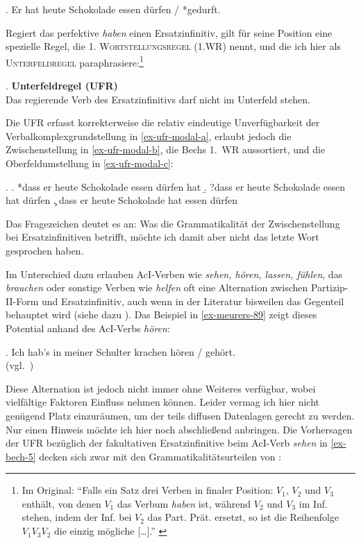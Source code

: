 \ex. Er hat heute Schokolade essen dürfen / *gedurft. \hfill \citep[(82)]{Meurers:99} 

Regiert das perfektive {\it haben} einen Ersatzinfinitiv, gilt für seine Position eine spezielle Regel, die \cite{Bech:63}  \textsc{1. Wortstellungsregel (1.WR)} nennt, und die ich hier als \textsc{Unterfeldregel} paraphrasiere:\footnote{Im Original: "`Falls ein Satz drei Verben in finaler Position: $V_1$, $V_2$ und $V_3$ enthält, von denen $V_1$ das Verbum {\it haben} ist, während $V_2$ und $V_3$ im Inf. stehen, indem der Inf. bei $V_2$ das Part. Prät. ersetzt, so ist die Reihenfolge $V_1 V_3 V_2$ die einzig mögliche [\ldots]."' \citep[\S 10]{Bech:63}} 

\ex. {\bf Unterfeldregel (UFR)} \label{ex-ufr}\\
Das regierende Verb des Ersatzinfinitivs darf nicht im Unterfeld stehen.

Die UFR erfasst korrekterweise die relativ eindeutige Unverfügbarkeit der Verbalkomplexgrundstellung in \ref{ex-ufr-modal-a}, erlaubt jedoch die Zwischenstellung in \ref{ex-ufr-modal-b}, die Bechs 1.~WR aussortiert, und die Oberfeldumstellung in \ref{ex-ufr-modal-c}:

\ex. 
\a. *dass er heute Schokolade essen dürfen hat \label{ex-ufr-modal-a}
\b. ?dass er heute Schokolade essen hat dürfen \label{ex-ufr-modal-b}
\c. dass er heute Schokolade hat essen dürfen \label{ex-ufr-modal-c}

Das Fragezeichen deutet es an: Was die Grammatikalität der Zwischenstellung bei Ersatzinfinitiven betrifft, möchte ich damit aber nicht das letzte Wort gesprochen haben.

Im Unterschied dazu erlauben AcI-Verben wie {\it sehen, hören, lassen, fühlen}, das  {\it brauchen} oder sonstige Verben wie {\it helfen} oft eine Alternation zwischen Partizip-II-Form und Ersatzinfinitiv, auch wenn in der Literatur bisweilen das Gegenteil behauptet wird (siehe dazu \citealt[55ff]{Meurers:99}). Das Beispiel in \ref{ex-meurers-89} zeigt dieses Potential anhand des AcI-Verbs {\it hören}: 

\ex. Ich hab's in meiner Schulter krachen hören / gehört.\\ (vgl.\ \citealt[(89a)]{Meurers:99})\label{ex-meurers-89}

Diese Alternation ist jedoch nicht immer ohne Weiteres verfügbar, wobei vielfältige Faktoren Einfluss nehmen können. Leider vermag ich hier nicht genügend Platz einzuräumen, um der teils diffusen Datenlagen gerecht zu werden. Nur einen Hinweis möchte ich hier noch abschlie\ss end anbringen. Die Vorhersagen der UFR bezüglich der fakultativen Ersatzinfinitive beim AcI-Verb {\it sehen} in \ref{ex-bech-5}  decken sich zwar mit den Grammatikalitätsurteilen von \cite{Bech:63}:%

